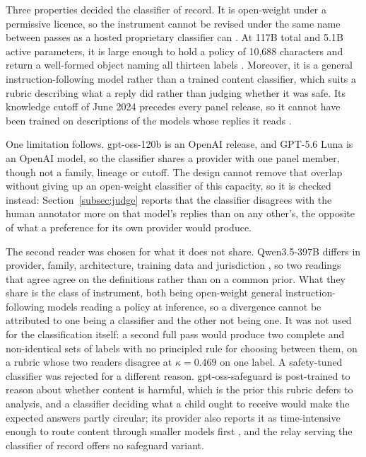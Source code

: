 Three properties decided the classifier of record. It is open-weight under a
permissive licence, so the instrument cannot be revised under the same name
between passes as a hosted proprietary classifier can
\cite{IntroducingGptoss2026}. At 117B total and 5.1B active parameters, it is
large enough to hold a policy of 10,688 characters and return a well-formed
object naming all thirteen labels \cite{openai2025gptoss120bgptoss20bmodel}. Moreover,
it is a general instruction-following model rather than a trained content
classifier, which suits a rubric describing what a reply did rather than judging
whether it was safe. Its knowledge cutoff of June 2024 precedes every panel
release, so it cannot have been trained on descriptions of the models whose
replies it reads \cite{Gptoss120bModelOpenAI}.

One limitation follows. gpt-oss-120b is an OpenAI release, and GPT-5.6 Luna is an
OpenAI model, so the classifier shares a provider with one panel member, though
not a family, lineage or cutoff. The design cannot remove that overlap without
giving up an open-weight classifier of this capacity, so it is checked instead:
Section~\ref{subsec:judge} reports that the classifier disagrees with the human
annotator more on that model's replies than on any other's, the opposite of what
a preference for its own provider would produce.

The second reader was chosen for what it does not share. Qwen3.5-397B differs in
provider, family, architecture, training data and jurisdiction \cite{qwen3.5}, so
two readings that agree agree on the definitions rather than on a common prior.
What they share is the class of instrument, both being open-weight general
instruction-following models reading a policy at inference, so a divergence
cannot be attributed to one being a classifier and the other not being one. It was not used
for the classification itself: a second full pass would produce two complete and
non-identical sets of labels with no principled rule for choosing between them,
on a rubric whose two readers disagree at $\kappa = 0.469$ on one label. A
safety-tuned classifier was rejected for a different reason. gpt-oss-safeguard is
post-trained to reason about whether content is harmful, which is the prior this
rubric defers to analysis, and a classifier deciding what a child ought to
receive would make the expected answers partly circular; its provider also
reports it as time-intensive enough to route content through smaller models first
\cite{IntroducingGptosssafeguard2025}, and the relay serving the classifier of
record offers no safeguard variant.

